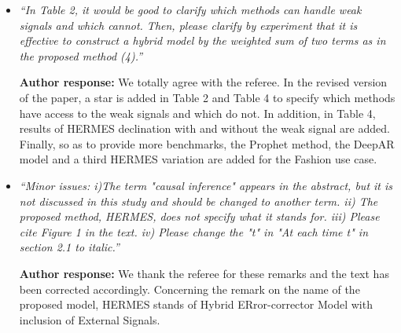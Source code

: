 \documentclass[10pt]{article} %
\begin{document}
\begin{itemize}
	\item {\em ``In Table 2, it would be good to clarify which methods can handle weak signals and which cannot. Then, please clarify by experiment that it is effective to construct a hybrid model by the weighted sum of two terms as in the proposed method (4).''} \medskip

	\textbf{Author response:} We totally agree with the referee. In the revised version of the paper, a star is added in Table 2 and Table 4 to specify which methods have access to the weak signals and which do not. In addition, in Table 4, results of HERMES declination with and without the weak signal are added. Finally, so as to provide more benchmarks, the Prophet method, the DeepAR model and a third HERMES variation are added for the Fashion use case.\\
	
	\item {\em ``Minor issues: i)The term "causal inference" appears in the abstract, but it is not discussed in this study and should be changed to another term. ii) The proposed method, HERMES, does not specify what it stands for. iii) Please cite Figure 1 in the text. iv) Please change the "t" in "At each time t" in section 2.1 to italic.''} \medskip

	\textbf{Author response:} We thank the referee for these remarks and the text has been corrected accordingly. Concerning the remark on the name of the proposed model, HERMES stands of Hybrid ERror-corrector Model with inclusion of External Signals.\\	
\end{itemize}
\end{document}
